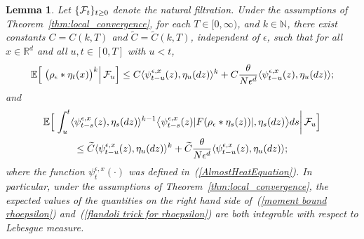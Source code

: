 \documentclass[12pt]{article}
\newtheorem{lemma}[theorem]{Lemma}
\newcommand{\IE}{\mathbb E}
\newcommand{\IR}{\mathbb R}
\newcommand{\IN}{\mathbb N}
\numberwithin{equation}{section}
\begin{document}
\begin{lemma}
\label{bounds on moments}
Let $\{{\cal F}_t\}_{t\geq 0}$ denote the natural filtration. 
Under the assumptions of Theorem~\ref{thm:local_convergence},
for each $T\in [0,\infty)$, and $k\in\IN$, there exist constants $C=C(k,T)$ and
$\widetilde{C}=\widetilde{C}(k,T)$, independent of $\epsilon$, such that for all 
$x\in\IR^d$ and all $u,t\in [0,T]$ with $u<t$,
\begin{equation}
\label{moment bound rhoepsilon}
\IE\Big[\left.\big(\rho_\epsilon*\eta_t(x)\big)^k\right| {\cal F}_u\Big]
\leq C\langle\psi_{t-u}^{\epsilon,x}(z), \eta_u(dz)\rangle^k
+C\frac{\theta}{N\epsilon^d}
\langle\psi_{t-u}^{\epsilon,x}(z), \eta_u(dz)\rangle;
\end{equation} 
and
\begin{multline}
\label{flandoli trick for rhoepsilon}
\IE\Big[\left. \int_u^t\langle\psi_{t-s}^{\epsilon,x}(z),\eta_s(dz)\rangle^{k-1}
\big\langle\psi_{t-s}^{\epsilon,x}(z)|F(\rho_\epsilon*\eta_s(z))|,
\eta_s(dz)\big\rangle ds\right| {\cal F}_u\Big]
\\
\leq\widetilde{C}\langle\psi_{t-u}^{\epsilon,x}(z), \eta_u(dz)\rangle^k
+\widetilde{C}\frac{\theta}{N\epsilon^d}
\langle\psi_{t-u}^{\epsilon,x}(z), \eta_u(dz)\rangle;
\end{multline}
where the function $\psi^{\epsilon,x}_t(\cdot)$ was
defined in~(\ref{AlmostHeatEquation}).
In particular, 
under the assumptions of Theorem~\ref{thm:local_convergence}, the
expected values of the
quantities on the right hand side of~(\ref{moment bound rhoepsilon})
and~(\ref{flandoli trick for rhoepsilon}) are both integrable 
with respect to Lebesgue measure.  
\end{lemma}
\end{document}
